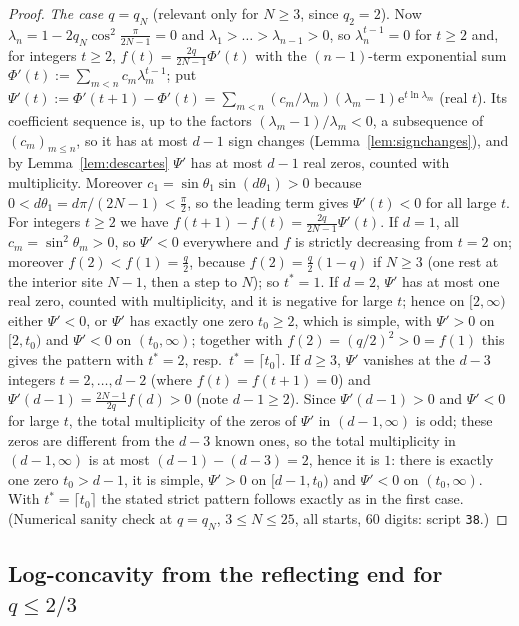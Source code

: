 \documentclass[11pt,a4paper]{article}
\theoremstyle{definition}
\theoremstyle{remark}
\newcommand{\ee}{\mathrm{e}}
\begin{document}
\begin{proof}
\emph{The case $q=q_N$} (relevant only for $N\ge3$, since $q_2=2$). Now $\lambda_n=1-2q_N\cos^2\frac\pi{2N-1}=0$ and
$\lambda_1>\dots>\lambda_{n-1}>0$, so $\lambda_n^{t-1}=0$ for $t\ge2$ and, for integers $t\ge2$,
$f(t)=\frac{2q}{2N-1}\Phi'(t)$ with the $(n-1)$-term exponential sum $\Phi'(t):=\sum_{m<n}c_m\lambda_m^{t-1}$; put
$\Psi'(t):=\Phi'(t+1)-\Phi'(t)=\sum_{m<n}(c_m/\lambda_m)(\lambda_m-1)\ee^{t\ln\lambda_m}$ (real $t$). Its coefficient
sequence is, up to the factors $(\lambda_m-1)/\lambda_m<0$, a subsequence of $(c_m)_{m\le n}$, so it has at most $d-1$ sign
changes (Lemma~\ref{lem:signchanges}), and by Lemma~\ref{lem:descartes} $\Psi'$ has at most $d-1$ real zeros, counted with
multiplicity. Moreover $c_1=\sin\theta_1\sin(d\theta_1)>0$ because $0<d\theta_1=d\pi/(2N-1)<\frac\pi2$, so the leading
term gives $\Psi'(t)<0$ for all large $t$. For integers $t\ge2$ we have $f(t+1)-f(t)=\frac{2q}{2N-1}\Psi'(t)$.
If $d=1$, all $c_m=\sin^2\theta_m>0$, so $\Psi'<0$ everywhere and $f$ is strictly decreasing from $t=2$ on; moreover
$f(2)<f(1)=\frac q2$, because $f(2)=\frac q2(1-q)$ if $N\ge3$ (one rest at the interior site $N-1$, then a step to $N$);
so $t^*=1$. If $d=2$, $\Psi'$ has at most one real zero, counted with multiplicity, and it is negative for large $t$; hence on
$[2,\infty)$ either $\Psi'<0$, or $\Psi'$ has exactly one zero $t_0\ge2$, which is simple, with $\Psi'>0$ on $[2,t_0)$
and $\Psi'<0$ on $(t_0,\infty)$; together with $f(2)=(q/2)^2>0=f(1)$ this gives the pattern with $t^*=2$, resp.\
$t^*=\lceil t_0\rceil$. If $d\ge3$, $\Psi'$ vanishes at the $d-3$ integers $t=2,\dots,d-2$ (where $f(t)=f(t+1)=0$) and
$\Psi'(d-1)=\frac{2N-1}{2q}f(d)>0$ (note $d-1\ge2$). Since $\Psi'(d-1)>0$ and $\Psi'<0$ for large $t$, the total
multiplicity of the zeros of $\Psi'$ in $(d-1,\infty)$ is odd; these zeros are different from the $d-3$ known ones, so the
total multiplicity in $(d-1,\infty)$ is at most $(d-1)-(d-3)=2$, hence it is $1$: there is exactly one zero $t_0>d-1$, it
is simple, $\Psi'>0$ on $[d-1,t_0)$ and $\Psi'<0$ on $(t_0,\infty)$. With $t^*=\lceil t_0\rceil$ the stated strict pattern
follows exactly as in the first case. (Numerical sanity check at $q=q_N$, $3\le N\le25$, all starts, $60$ digits:
script \texttt{38}.) %
\end{proof}

\subsection{Log-concavity from the reflecting end for \texorpdfstring{$q\le 2/3$}{q<=2/3}}
\end{document}
